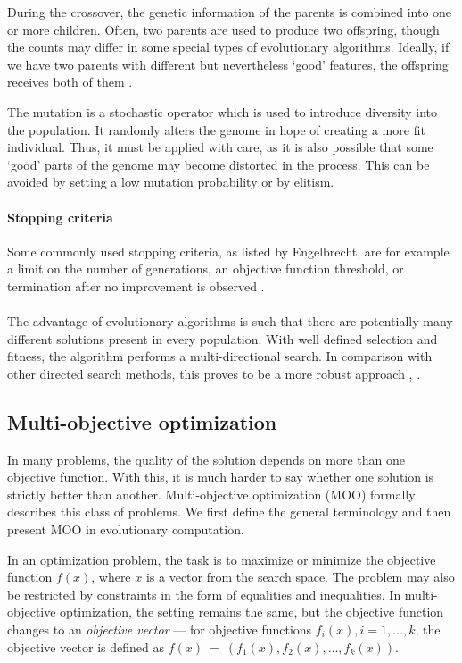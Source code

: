 During the crossover, the genetic information of the parents is combined into
one or more children. Often, two parents are used to produce two
offspring, though the counts may differ in some special types of evolutionary
algorithms. Ideally, if we have two parents with different but nevertheless
`good' features, the offspring receives both of them
\citep{Eiben:2015:IEC:2810085}.

The mutation is a stochastic operator which is used to introduce diversity into
the population. It randomly alters the genome in hope of creating a more
fit individual. Thus, it must be applied with care, as it is
also possible that some `good' parts of the genome may become distorted in the
process. This can be avoided by setting a low mutation probability or by
elitism.

\paragraph{Stopping criteria}
Some commonly used stopping criteria, as listed by Engelbrecht, are for example 
a limit on the number of generations, an objective function threshold, or
termination after no improvement is observed
\citep{Engelbrecht:2007:CII:1557464}.

\paragraph*{}
The advantage of evolutionary algorithms is such that there are potentially 
many different solutions present in every population. With well defined 
selection and fitness, the algorithm performs a multi-directional search. 
In comparison with other directed search methods, this proves to be a more 
robust approach \citep{Michalewicz:1996:GAD:229930}, 
\cite{Mitchell:1997:ML:541177}.

\subsection{Multi-objective optimization} \label{moo}
In many problems, the quality of the solution depends on more than one
objective function. With this, it is much harder to say whether one solution
is strictly better than another. Multi-objective optimization (MOO) formally
describes this class of problems. We first define the general terminology
and then present MOO in evolutionary computation.

In an optimization problem, the task is to maximize or minimize the objective
function $f(x)$, where $x$ is a vector from the search space. The problem may
also be restricted by constraints in the form of equalities and inequalities.
In multi-objective optimization, the setting remains the same, but the
objective function changes to an \emph{objective vector} ---
for objective functions $f_i(x), i = 1,\ldots,k$, the objective vector is 
defined as $f(x)~=~(f_1(x), f_2(x), \ldots, f_k(x))$.

